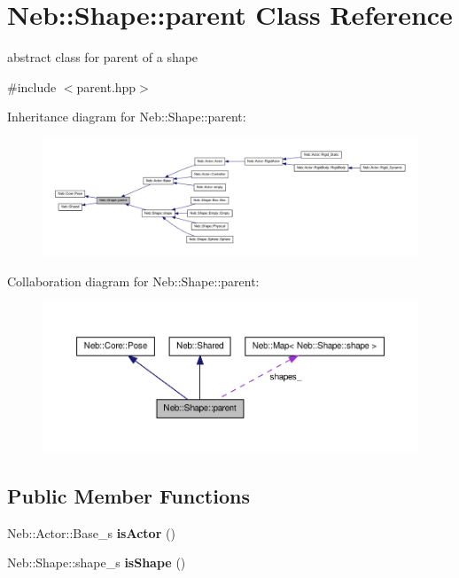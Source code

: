 \hypertarget{classNeb_1_1Shape_1_1parent}{\section{\-Neb\-:\-:\-Shape\-:\-:parent \-Class \-Reference}
\label{classNeb_1_1Shape_1_1parent}
}


abstract class for parent of a shape  




{\ttfamily \#include $<$parent.\-hpp$>$}



\-Inheritance diagram for \-Neb\-:\-:\-Shape\-:\-:parent\-:\nopagebreak
\begin{figure}[H]
\begin{center}
\leavevmode
\includegraphics[width=350pt]{classNeb_1_1Shape_1_1parent__inherit__graph}
\end{center}
\end{figure}


\-Collaboration diagram for \-Neb\-:\-:\-Shape\-:\-:parent\-:\nopagebreak
\begin{figure}[H]
\begin{center}
\leavevmode
\includegraphics[width=350pt]{classNeb_1_1Shape_1_1parent__coll__graph}
\end{center}
\end{figure}
\subsection*{\-Public \-Member \-Functions}
\begin{DoxyCompactItemize}
\item 
\hypertarget{classNeb_1_1Shape_1_1parent_a0a5a20b5beac8a00e08606a18878e241}{\-Neb\-::\-Actor\-::\-Base\-\_\-s {\bfseries is\-Actor} ()}\label{classNeb_1_1Shape_1_1parent_a0a5a20b5beac8a00e08606a18878e241}

\item 
\hypertarget{classNeb_1_1Shape_1_1parent_a56ccd1a041cc872b4336f9be7425e0f6}{\-Neb\-::\-Shape\-::shape\-\_\-s {\bfseries is\-Shape} ()}\label{classNeb_1_1Shape_1_1parent_a56ccd1a041cc872b4336f9be7425e0f6}

\end{DoxyCompactItemize}
